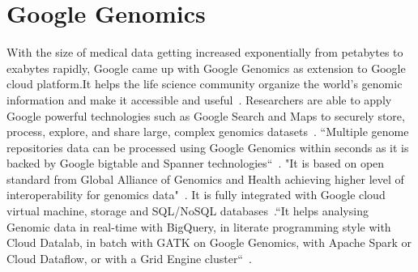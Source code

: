 \section{Google Genomics}

With the size of medical data getting increased exponentially from 
petabytes to exabytes rapidly, Google came up with Google Genomics 
as extension to Google cloud platform.It helps the life science 
community organize the world’s genomic information and make it 
accessible and useful~\cite{hid-sp18-523-www-genomics}. 
Researchers are able to apply Google powerful technologies such as 
Google Search and Maps to securely store, process, explore, and share 
large, complex genomics datasets~\cite{hid-sp18-523-www-genomics}.
``Multiple genome repositories data can be processed using Google 
Genomics within seconds as it is backed by Google bigtable and 
Spanner technologies``~\cite{hid-sp18-523-www-genomics}. 
"It is based on open standard from Global Alliance of Genomics and 
Health achieving higher level of interoperability for genomics 
data"~\cite{hid-sp18-523-www-genomics}. It is fully integrated with 
Google cloud virtual machine, storage and SQL/NoSQL 
databases~\cite{hid-sp18-523-www-genomics}.``It helps analysing Genomic 
data in real-time with BigQuery, in literate programming style 
with Cloud Datalab, in batch with GATK on Google Genomics, with 
Apache Spark or Cloud Dataflow, or with a Grid Engine 
cluster``~\cite{hid-sp18-523-www-genomics}.

